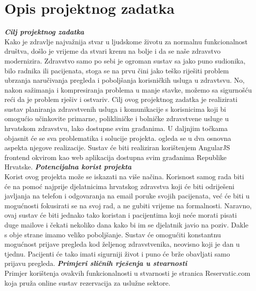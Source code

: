 \chapter{Opis projektnog zadatka}
		
		\textbf{\textit{Cilj projektnog zadatka}}\\
		
		\texttt{}{Kako je zdravlje najvažnija stvar u ljudskome životu za normalnu funkcionalnost društva, došlo je vrijeme da stvari krenu na bolje i da se naše zdravstvo modernizira. Zdravstvo samo po sebi je ogroman sustav sa jako puno sudionika, bilo radnika ili pacijenata, stoga se na prvu čini jako teško riješiti problem ubrzanja naručivanja pregleda i poboljšanja korisničkih usluga u zdravtsvu. No, nakon sažimanja i kompresiranja problema u manje stavke, možemo sa sigurnošću reći da je problem rješiv i ostvariv. Cilj ovog projektnog zadatka je realizirati sustav planiranja zdravstvenih usluga i komunikacije s 
korisnicima koji bi omogućio učinkovite primarne, polikliničke i bolničke zdravstvene usluge u hrvatskom zdravstvu, lako dostupne svim građanima. U daljnjim točkama objasnit će se sva problematika i solucije projekta.
ogleda se u dva osnovna aspekta njegove realizacije. Sustav će biti realiziran korištenjem AngularJS frontend okvirom kao web aplikacija dostupna svim građanima Republike Hrvatske.  } \newline \newline
            \textbf{\textit{Potencijalna korist projekta}}\\ 
            \newline
            \texttt{}{Korist ovog projekta može se iskazati na više načina. Korisnost samog rada biti će na pomoć najprije djelatnicima hrvatskog zdravstva koji će biti odriješeni javljanja na telefon i odgovaranja na email poruke svojih pacijenata, već će biti u mogućnosti fokusirati se na svoj rad, a ne gubiti vrijeme na formalnosti. Naravno, ovaj sustav će biti jednako tako koristan i pacijentima koji neće morati pisati duge mailove i čekati nekoliko dana kako bi im se djelatnik javio na poziv. Dakle s obje strane imamo veliko poboljšanje. Sustav će omogućiti konstantnu mogućnost prijave pregleda kod željenog zdravstvenika, neovisno koji je dan u tjednu. Pacijenti će tako imati sigurniji život i puno će brže obavljati samo prijavu pregleda. }
             \newline
            \eject
            \textbf{\textit{Primjeri sličnih rješenja u stvarnosti}}\\
            \newline
            \texttt{}{Primjer korištenja ovakvih funkcionalnosti u stvarnosti je stranica Reservatic.com koja pruža online sustav rezervacija za uslužne sektore. }
            \newline
             
